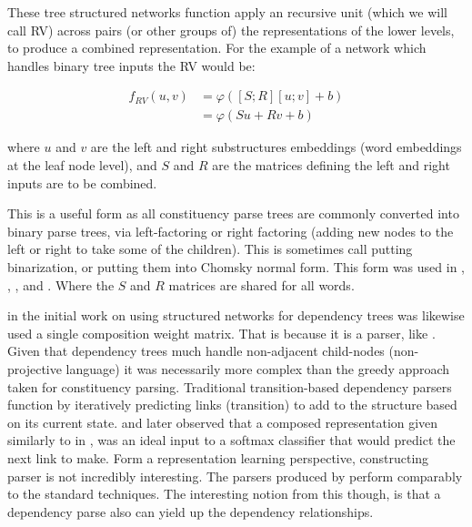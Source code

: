 \documentclass[12pt,parskip]{komatufte}
\begin{document}
These tree structured networks function apply an recursive unit (which we will call RV) across pairs (or other groups of) the representations of the lower levels, to produce a combined representation.
For the example of a network which handles binary tree inputs the RV would be:

\begin{align}
	f_{RV}(u, v) &= \varphi\left( [S;R][u;v] + b \right) \\ \label{equ:rnn1}
			     &= \varphi\left( Su +Rv + b \right)
\end{align}

where $u$ and $v$ are the left and right substructures embeddings (word embeddings at the leaf node level), and $S$ and $R$ are the matrices defining the left and right inputs are to be combined.

This is a useful form as all constituency parse trees are commonly converted into binary parse trees, via left-factoring or right factoring (adding new nodes to the left or right to take some of the children).
This is sometimes call putting binarization, or putting them into  Chomsky normal form.
This form was used in , \textcite{SocherEtAl2011:RAE},  \textcite{SocherEtAl2011:PoolRAE},
 \textcite{Socher2011ParsingPhrases} and \textcite{zhang2014BRAE}.
Where the $S$ and $R$ matrices are shared for all words.


 in the initial work on using structured networks for dependency trees was likewise used a single composition weight matrix.
That is because it is a parser, like \textcite{socher2010PhraseEmbedding}.
Given that dependency trees much handle non-adjacent child-nodes (non-projective language) it was necessarily more complex than the greedy approach taken for constituency parsing.
Traditional transition-based dependency parsers function by iteratively predicting links (transition) to add to the structure based on its current state.
\textcite{stenetorp2013transition} and later  observed that a composed representation given similarly to in , was an ideal input to a softmax classifier that would predict the next link to make.
Form a representation learning perspective, constructing parser is not incredibly interesting.
The parsers produced by \textcite{socher2010PhraseEmbedding, stenetorp2013transition, bowman2016fast} perform comparably to the standard techniques.
The interesting notion from this though, is that a dependency parse also can yield up the dependency relationships.
\end{document}
